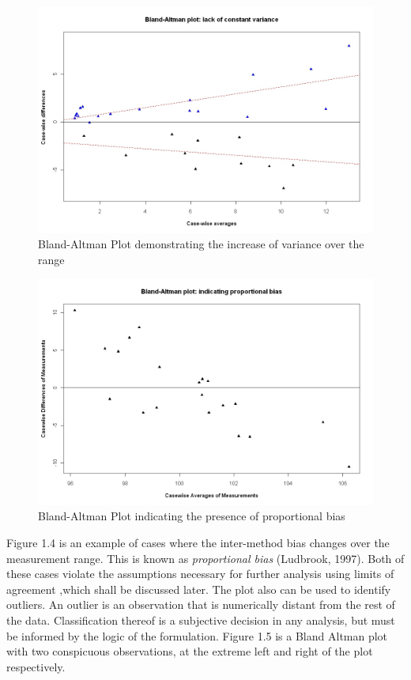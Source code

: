 \documentclass[12pt, a4paper]{report}
\theoremstyle{plain}
\theoremstyle{definition}
\theoremstyle{remark}
\begin{document}
	
	\begin{figure}[h!]
		\begin{center}
			\includegraphics[width=125mm]{images/BAFanEffect.jpeg}
			\caption{Bland-Altman Plot demonstrating the increase of variance over the range}\label{BAFanEffect}
		\end{center}
	\end{figure}
	
	\begin{figure}[h!]
		\begin{center}
			\includegraphics[width=125mm]{images/PropBias.jpeg}
			\caption{Bland-Altman Plot indicating the presence of proportional bias}\label{PropBias}
		\end{center}
	\end{figure}
	
	\newpage
	Figure 1.4 is an example of cases where the inter-method bias
	changes over the measurement range. This is known as\textit{ proportional
		bias} (Ludbrook, 1997). Both of these cases violate the assumptions
	necessary for further analysis using limits of agreement ,which
	shall be discussed later. The plot also can be used to identify
	outliers. An outlier is an observation that is numerically distant
	from the rest of the data. Classification thereof is a subjective
	decision in any analysis, but must be informed by the logic of the
	formulation. Figure 1.5 is a Bland Altman plot with two
	conspicuous observations, at the extreme left and right of the
	plot respectively.
	
\end{document}
